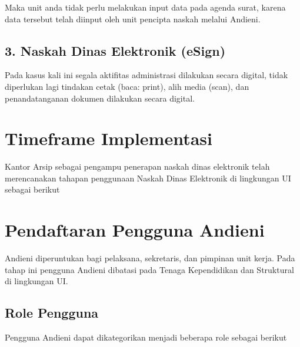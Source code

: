 \documentclass[letterpaper,10pt,bahasai]{sphinxmanual}
\begin{document}
Maka unit anda tidak perlu melakukan input data pada agenda surat, karena data tersebut telah diinput oleh unit pencipta
naskah melalui Andieni.

\noindent{}


\section{3. Naskah Dinas Elektronik (eSign)}
\label{\detokenize{interface:naskah-dinas-elektronik-esign}}
Pada kasus kali ini segala aktifitas administrasi dilakukan secara digital, tidak diperlukan lagi tindakan cetak
(baca: print), alih media (scan), dan penandatanganan dokumen dilakukan secara digital.

\noindent{}


\chapter{Timeframe Implementasi}
\label{\detokenize{interface:timeframe-implementasi}}
Kantor Arsip sebagai pengampu penerapan naskah dinas elektronik telah merencanakan tahapan penggunaan Naskah Dinas Elektronik
di lingkungan UI sebagai berikut

\noindent{}


\chapter{Pendaftaran Pengguna Andieni}
\label{\detokenize{daftarPengguna:pendaftaran-pengguna-andieni}}\label{\detokenize{daftarPengguna::doc}}
Andieni diperuntukan bagi pelaksana, sekretaris, dan pimpinan unit kerja. Pada tahap ini pengguna Andieni dibatasi pada
Tenaga Kependidikan dan Struktural di lingkungan UI.


\section{Role Pengguna}
\label{\detokenize{daftarPengguna:role-pengguna}}
Pengguna Andieni dapat dikategorikan menjadi beberapa role sebagai berikut
\end{document}
